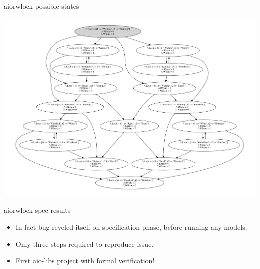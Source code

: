 \documentclass[12pt]{beamer}
\begin{document}
  \begin{frame}{aiorwlock possible states}
      \begin{center}
          \includegraphics[scale=0.35,angle=90]{figures/aiorwlock_model}
      \end{center}
  \end{frame}
  \begin{frame}{aiorwlock spec results}
    \begin{itemize}
      \item In fact bug reveled itself on specification phase, before
          running any models.
      \item Only three steps required to reproduce issue.
      \item First aio-libs project with formal verification!
    \end{itemize}
  \end{frame}
\end{document}

